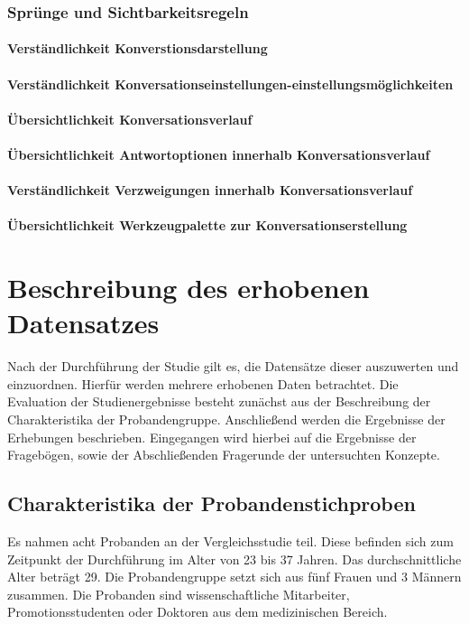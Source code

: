 \subsubsection{Sprünge und Sichtbarkeitsregeln}
\paragraph{Verständlichkeit Konverstionsdarstellung}
\paragraph{Verständlichkeit Konversationseinstellungen-einstellungsmöglichkeiten}
\paragraph{Übersichtlichkeit Konversationsverlauf}
\paragraph{Übersichtlichkeit Antwortoptionen innerhalb Konversationsverlauf}
\paragraph{Verständlichkeit Verzweigungen innerhalb Konversationsverlauf}
\paragraph{Übersichtlichkeit Werkzeugpalette zur Konversationserstellung}


\section{Beschreibung des erhobenen Datensatzes}
Nach der Durchführung der Studie gilt es, die Datensätze dieser auszuwerten und einzuordnen. Hierfür werden mehrere erhobenen Daten betrachtet. Die Evaluation der Studienergebnisse besteht zunächst aus der Beschreibung der Charakteristika der Probandengruppe. Anschließend werden die Ergebnisse der Erhebungen beschrieben. Eingegangen wird hierbei auf die Ergebnisse der Fragebögen, sowie der Abschließenden Fragerunde der untersuchten Konzepte.  


\subsection{Charakteristika der Probandenstichproben}
Es nahmen acht Probanden an der Vergleichsstudie teil. Diese befinden sich zum Zeitpunkt der Durchführung im Alter von 23 bis 37 Jahren. Das durchschnittliche Alter beträgt 29. Die Probandengruppe setzt sich aus fünf Frauen und 3 Männern zusammen. Die Probanden sind wissenschaftliche Mitarbeiter, Promotionsstudenten oder Doktoren aus dem medizinischen Bereich. 

